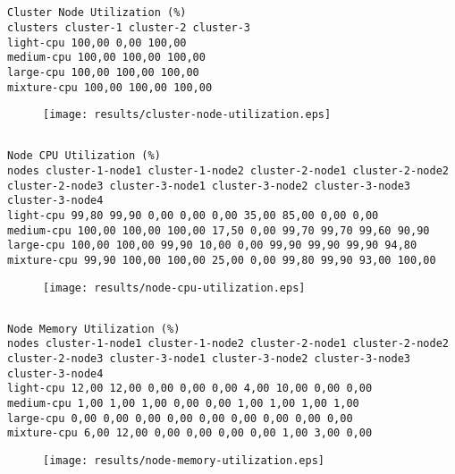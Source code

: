 \documentclass{elsart}
\begin{document}
\subsection{}

\begin{lstlisting}[caption={}]
Cluster Node Utilization (%)
clusters cluster-1 cluster-2 cluster-3
light-cpu 100,00 0,00 100,00
medium-cpu 100,00 100,00 100,00
large-cpu 100,00 100,00 100,00
mixture-cpu 100,00 100,00 100,00
\end{lstlisting}

\begin{figure}[ht]
\centering
\texttt{[image: results/cluster-node-utilization.eps]}
\caption{}\label{fig:cluster-node-utilization.eps}
\end{figure}

\subsection{}

\begin{lstlisting}[caption={}]
Node CPU Utilization (%)
nodes cluster-1-node1 cluster-1-node2 cluster-2-node1 cluster-2-node2 cluster-2-node3 cluster-3-node1 cluster-3-node2 cluster-3-node3 cluster-3-node4
light-cpu 99,80 99,90 0,00 0,00 0,00 35,00 85,00 0,00 0,00
medium-cpu 100,00 100,00 100,00 17,50 0,00 99,70 99,70 99,60 90,90
large-cpu 100,00 100,00 99,90 10,00 0,00 99,90 99,90 99,90 94,80
mixture-cpu 99,90 100,00 100,00 25,00 0,00 99,80 99,90 93,00 100,00
\end{lstlisting}

\begin{figure}[ht]
\centering
\texttt{[image: results/node-cpu-utilization.eps]}
\caption{}\label{fig:node-cpu-utilization.eps}
\end{figure}

\subsection{}

\begin{lstlisting}[caption={}]
Node Memory Utilization (%)
nodes cluster-1-node1 cluster-1-node2 cluster-2-node1 cluster-2-node2 cluster-2-node3 cluster-3-node1 cluster-3-node2 cluster-3-node3 cluster-3-node4
light-cpu 12,00 12,00 0,00 0,00 0,00 4,00 10,00 0,00 0,00
medium-cpu 1,00 1,00 1,00 0,00 0,00 1,00 1,00 1,00 1,00
large-cpu 0,00 0,00 0,00 0,00 0,00 0,00 0,00 0,00 0,00
mixture-cpu 6,00 12,00 0,00 0,00 0,00 0,00 1,00 3,00 0,00
\end{lstlisting}

\begin{figure}[ht]
\centering
\texttt{[image: results/node-memory-utilization.eps]}
\caption{}\label{fig:node-memory-utilization.eps}
\end{figure}
\end{document}
